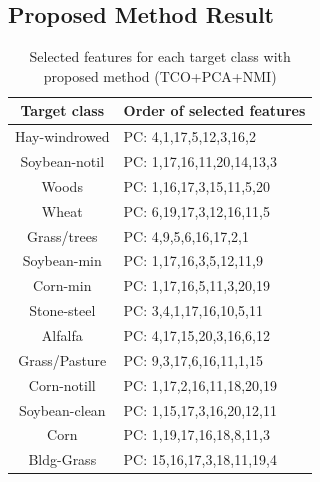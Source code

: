 \documentclass[document.tex]{subfiles}
\begin{document}
\subsection{Proposed Method Result}
\begin{table}[H]
	\caption{Selected features for each target class with proposed method (TCO+PCA+NMI)}
	\begin{center}
		\begin{tabular}{|c|l|}
			\hline
			Target class & Order of selected features\\ \hline
			Hay-windrowed & PC: 4,1,17,5,12,3,16,2\\ \hline
			Soybean-notil & PC: 1,17,16,11,20,14,13,3\\ \hline
			Woods & PC: 1,16,17,3,15,11,5,20\\ \hline
			Wheat & PC: 6,19,17,3,12,16,11,5\\ \hline
			Grass/trees & PC: 4,9,5,6,16,17,2,1\\ \hline
			Soybean-min & PC: 1,17,16,3,5,12,11,9\\ \hline
			Corn-min & PC: 1,17,16,5,11,3,20,19\\ \hline
			Stone-steel & PC: 3,4,1,17,16,10,5,11\\ \hline
			Alfalfa & PC: 4,17,15,20,3,16,6,12\\ \hline
			Grass/Pasture & PC: 9,3,17,6,16,11,1,15\\ \hline
			Corn-notill & PC: 1,17,2,16,11,18,20,19\\ \hline
			Soybean-clean & PC: 1,15,17,3,16,20,12,11\\ \hline
			Corn & PC: 1,19,17,16,18,8,11,3\\ \hline
			Bldg-Grass & PC: 15,16,17,3,18,11,19,4\\ \hline
		\end{tabular}
	\end{center}
	\label{tab:Selected features for each target class with proposed method (TCO+PCA+NMI)}
\end{table}
\end{document}
